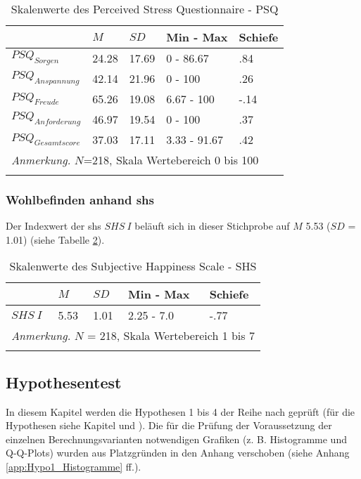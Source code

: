 \begin{table}[ht]
\begin{tabular}{m{6em} m{3em}  m{3em}  m{5em} m{3em}} 
  \hline
  & $M$ & $SD$ & Min - Max & Schiefe\\
  \hline
  $PSQ_{Sorgen}$ & 24.28 & 17.69 & 0 - 86.67 & .84 \\
  $PSQ_{Anspannung}$ & 42.14 & 21.96 & 0 - 100 & .26\\
  $PSQ_{Freude}$ & 65.26 & 19.08 & 6.67 - 100 & -.14\\
  $PSQ_{Anforderung}$ & 46.97 & 19.54 & 0 - 100 & .37 \\
  $PSQ_{Gesamtscore}$ & 37.03 & 17.11 & 3.33 - 91.67 & .42\\
  \hline
  \multicolumn{5}{l}{\textit{Anmerkung.} $N$=218, Skala Wertebereich 0 bis 100}\\
  &&&&\\
\end{tabular}
\caption{Skalenwerte des Perceived Stress Questionnaire - PSQ}
\label{table:PSQDeskriptiv}
\end{table}


\subsubsection{Wohlbefinden anhand \acrshort{shs}}
Der Indexwert der \acrfull{shs} $SHS~I$ beläuft sich in dieser Stichprobe auf $M$ 5.53 ($SD$ = 1.01) (siehe Tabelle \ref{table:SHSDeskriptiv}).

\begin{table}[ht]
\begin{tabular}{m{6em} m{3em}  m{3em}  m{5em} m{3em}} 
  \hline
  & $M$ & $SD$ & Min - Max & Schiefe\\
  \hline
  $SHS~I$ & 5.53 & 1.01 & 2.25 - 7.0 & -.77 \\
  \hline
  \multicolumn{5}{l}{\textit{Anmerkung.} $N$ = 218, Skala Wertebereich 1 bis 7}\\
  &&&&\\
\end{tabular}
\caption{Skalenwerte des Subjective Happiness Scale - SHS}
\label{table:SHSDeskriptiv}
\end{table}

\subsection{Hypothesentest} \label{sec:Hypothesentest}
In diesem Kapitel werden die Hypothesen 1 bis 4 der Reihe nach geprüft (für die Hypothesen siehe Kapitel \textit{} und \textit{}). Die für die Prüfung der Voraussetzung der einzelnen Berechnungsvarianten notwendigen Grafiken (z. B. Histogramme und Q-Q-Plots) wurden aus Platzgründen in den Anhang verschoben (siehe Anhang \ref{app:Hypo1_Histogramme} ff.).

